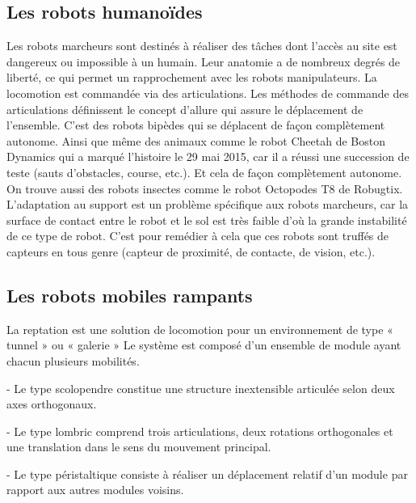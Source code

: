 \subsection{Les robots humanoïdes}
Les robots marcheurs sont destinés à réaliser des tâches dont l’accès au site est  dangereux ou impossible à un humain. Leur anatomie a de nombreux degrés de liberté, ce qui permet un rapprochement avec les robots manipulateurs. La locomotion est commandée via des articulations. Les méthodes de commande des articulations définissent le concept d’allure qui assure le déplacement de l’ensemble. C’est des robots bipèdes qui se déplacent de façon complètement autonome.
Ainsi que même des animaux comme le robot Cheetah de Boston Dynamics qui a marqué l’histoire le 29 mai 2015, car il a réussi une succession de teste (sauts d’obstacles, course, etc.). Et cela de façon complètement autonome.
On trouve aussi des robots insectes comme le robot Octopodes T8 de Robugtix. L’adaptation au support est un problème spécifique aux robots marcheurs, car la surface de contact entre le robot et le sol est très faible d’où la grande instabilité de ce type de robot. C’est pour remédier à cela que ces robots sont truffés de capteurs en tous genre (capteur de proximité, de contacte, de vision, etc.).
\subsection{Les robots mobiles rampants}
La reptation est une solution de locomotion pour un environnement de type « tunnel » ou « galerie »  Le système est composé d’un ensemble de module ayant chacun plusieurs mobilités.

- Le type scolopendre constitue une structure inextensible articulée selon deux axes orthogonaux.

- Le type lombric comprend trois articulations, deux rotations orthogonales et une translation dans le sens du mouvement principal.

- Le type péristaltique consiste à réaliser un déplacement relatif d’un module par rapport aux autres modules voisins.








